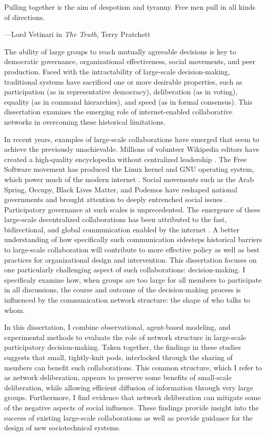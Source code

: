 \epigraph
{Pulling together is the aim of despotism and tyranny. Free men pull in all kinds of directions.}
{---Lord Vetinari in {\em The Truth}, Terry Pratchett}

The ability of large groups to reach mutually agreeable decisions is key to
democratic governance, organizational effectiveness, social movements, and peer production.
Faced with the intractability of large-scale decision-making, traditional
systems have sacrificed one or more desirable properties, such as participation
(as in representative democracy), deliberation (as in voting), equality
(as in command hierarchies), and speed (as in formal consensus).
This dissertation examines the emerging role of internet-enabled collaborative
networks in overcoming these historical limitations.

In recent years, examples of large-scale collaborations have emerged that seem
to achieve the previously unachievable. Millions of volunteer Wikipedia editors
have created a high-quality encyclopedia without centralized leadership
\cite{keegan_evolution_2017, giles_internet_2005}.
The Free Software movement has produced the Linux kernel and GNU operating
system, which power much of the modern internet
\cite{coleman_coding_2012, benkler_coases_2002, raymond_cathedral_1999}.
Social movements such as the Arab Spring, Occupy, Black Lives Matter, and
Podemos have reshaped national governments and brought attention to deeply
entrenched social issues
\cite{tufekci_twitter_2017, gonzalez-bailon_networked_2016}.
Participatory governance at such scales is unprecedented.
The emergence of these large-scale decentralized collaborations has been
attributed to the fast, bidirectional,
and global communication enabled by the internet
\cite{tufekci_twitter_2017, benkler_coases_2002}.
A better understanding of how specifically such communication sidesteps
historical barriers to large-scale collaboration will contribute to more
effective policy as well as best practices for organizational design and
intervention.
This dissertation focuses on one particularly challenging aspect of
such collaborations: decision-making.
I specificaly examine how,
when groups are too large for all members to participate in all discussions,
the course and outcome of the decision-making process is influenced by the
communication network structure: the shape of who talks to whom.

In this dissertation, I combine observational, agent-based modeling, and experimental methods to evaluate the role of network structure in large-scale participatory decision-making.
Taken together, the findings in these studies suggests that small, tightly-knit pods, interlocked through the sharing of members can benefit such collaborations.
This common structure, which I refer to as network deliberation, appears to preserve some benefits of small-scale deliberation, while allowing efficient diffusion of information through very large groups.
Furthermore, I find evidence that network deliberation can mitigate some of the negative aspects of social influence.
These findings provide insight into the success of existing large-scale collaborations as well as provide guidance for the design of new sociotechnical systems.


